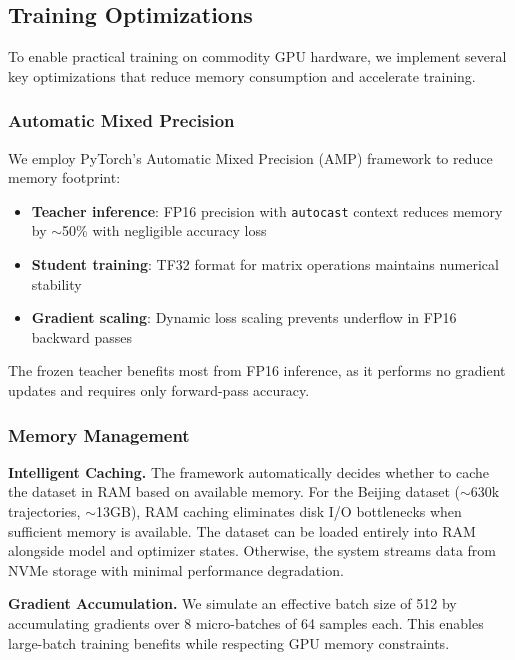 \subsection{Training Optimizations}
\label{sec:impl-opt}

To enable practical training on commodity GPU hardware, we implement several key optimizations that reduce memory consumption and accelerate training.

\subsubsection{Automatic Mixed Precision}

We employ PyTorch's Automatic Mixed Precision (AMP) framework to reduce memory footprint:

\begin{itemize}[noitemsep,topsep=0pt]
    \item \textbf{Teacher inference}: FP16 precision with \texttt{autocast} context reduces memory by $\sim$50\% with negligible accuracy loss
    \item \textbf{Student training}: TF32 format for matrix operations maintains numerical stability
    \item \textbf{Gradient scaling}: Dynamic loss scaling prevents underflow in FP16 backward passes
\end{itemize}

The frozen teacher benefits most from FP16 inference, as it performs no gradient updates and requires only forward-pass accuracy.

\subsubsection{Memory Management}

\textbf{Intelligent Caching.} The framework automatically decides whether to cache the dataset in RAM based on available memory. For the Beijing dataset ($\sim$630k trajectories, $\sim$13GB), RAM caching eliminates disk I/O bottlenecks when sufficient memory is available. The dataset can be loaded entirely into RAM alongside model and optimizer states. Otherwise, the system streams data from NVMe storage with minimal performance degradation.

\textbf{Gradient Accumulation.} We simulate an effective batch size of 512 by accumulating gradients over 8 micro-batches of 64 samples each. This enables large-batch training benefits while respecting GPU memory constraints.

